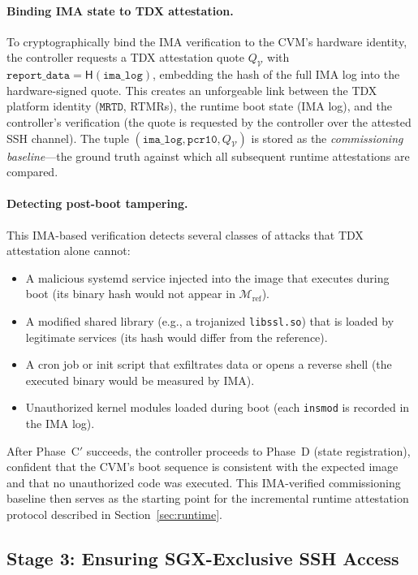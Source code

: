 \paragraph{Binding IMA state to TDX attestation.}
To cryptographically bind the IMA verification to the CVM's hardware
identity, the controller requests a TDX attestation quote
$Q_\mathcal{V}$ with
$\texttt{report\_data} = \textsf{H}(\texttt{ima\_log})$, embedding
the hash of the full IMA log into the hardware-signed quote.  This
creates an unforgeable link between the TDX platform identity
($\texttt{MRTD}$, RTMRs), the runtime boot state (IMA log), and the
controller's verification (the quote is requested by the controller
over the attested SSH channel).  The tuple
$(\texttt{ima\_log}, \texttt{pcr10}, Q_\mathcal{V})$ is stored as
the \emph{commissioning baseline}---the ground truth against which
all subsequent runtime attestations are compared.

\paragraph{Detecting post-boot tampering.}
This IMA-based verification detects several classes of attacks that
TDX attestation alone cannot:
\begin{itemize}[nosep]
    \item A malicious systemd service injected into the image that
    executes during boot (its binary hash would not appear in
    $\mathcal{M}_{\text{ref}}$).
    \item A modified shared library (e.g., a trojanized
    \texttt{libssl.so}) that is loaded by legitimate services (its
    hash would differ from the reference).
    \item A cron job or init script that exfiltrates data or opens a
    reverse shell (the executed binary would be measured by IMA).
    \item Unauthorized kernel modules loaded during boot (each
    \texttt{insmod} is recorded in the IMA log).
\end{itemize}

\noindent After Phase~C$'$ succeeds, the controller proceeds to
Phase~D (state registration), confident that the CVM's boot
sequence is consistent with the expected image and that no
unauthorized code was executed.  This IMA-verified commissioning
baseline then serves as the starting point for the incremental
runtime attestation protocol described in
Section~\ref{sec:runtime}.

\subsection{Stage 3: Ensuring SGX-Exclusive SSH Access}
\label{sec:commissioning:stage3}

